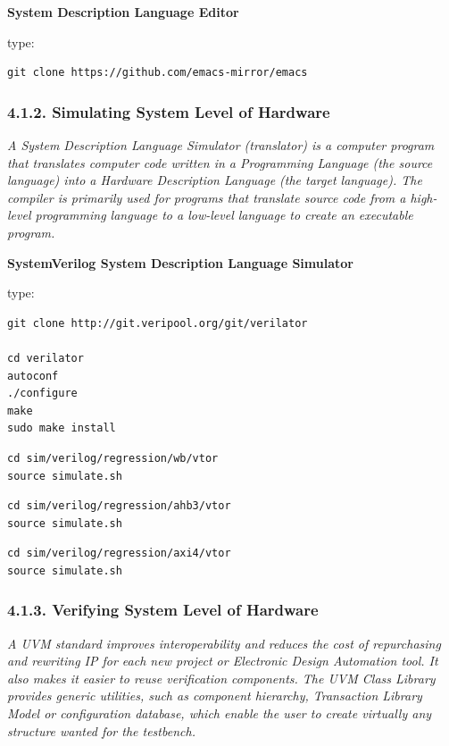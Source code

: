 \documentclass[
]{article}
\begin{document}
\textbf{System Description Language Editor}

type:

\begin{verbatim}
git clone https://github.com/emacs-mirror/emacs
\end{verbatim}

\hypertarget{simulating-system-level-of-hardware-1}{%
\subsubsection{4.1.2. Simulating System Level of
Hardware}\label{simulating-system-level-of-hardware-1}}

\emph{A System Description Language Simulator (translator) is a computer
program that translates computer code written in a Programming Language
(the source language) into a Hardware Description Language (the target
language). The compiler is primarily used for programs that translate
source code from a high-level programming language to a low-level
language to create an executable program.}

\textbf{SystemVerilog System Description Language Simulator}

type:

\begin{verbatim}
git clone http://git.veripool.org/git/verilator

cd verilator
autoconf
./configure
make
sudo make install
\end{verbatim}

\begin{verbatim}
cd sim/verilog/regression/wb/vtor
source simulate.sh
\end{verbatim}

\begin{verbatim}
cd sim/verilog/regression/ahb3/vtor
source simulate.sh
\end{verbatim}

\begin{verbatim}
cd sim/verilog/regression/axi4/vtor
source simulate.sh
\end{verbatim}

\hypertarget{verifying-system-level-of-hardware-1}{%
\subsubsection{4.1.3. Verifying System Level of
Hardware}\label{verifying-system-level-of-hardware-1}}

\emph{A UVM standard improves interoperability and reduces the cost of
repurchasing and rewriting IP for each new project or Electronic Design
Automation tool. It also makes it easier to reuse verification
components. The UVM Class Library provides generic utilities, such as
component hierarchy, Transaction Library Model or configuration
database, which enable the user to create virtually any structure wanted
for the testbench.}
\end{document}
